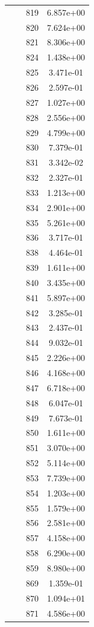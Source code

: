 \documentclass[12pt]{article}
\begin{document}
\begin{longtable}{@{}cccc@{}}
 &  & 819 & 6.857e+00 \\
 &  & 820 & 7.624e+00 \\
 &  & 821 & 8.306e+00 \\
 &  & 824 & 1.438e+00 \\
 &  & 825 & 3.471e-01 \\
 &  & 826 & 2.597e-01 \\
 &  & 827 & 1.027e+00 \\
 &  & 828 & 2.556e+00 \\
 &  & 829 & 4.799e+00 \\
 &  & 830 & 7.379e-01 \\
 &  & 831 & 3.342e-02 \\
 &  & 832 & 2.327e-01 \\
 &  & 833 & 1.213e+00 \\
 &  & 834 & 2.901e+00 \\
 &  & 835 & 5.261e+00 \\
 &  & 836 & 3.717e-01 \\
 &  & 838 & 4.464e-01 \\
 &  & 839 & 1.611e+00 \\
 &  & 840 & 3.435e+00 \\
 &  & 841 & 5.897e+00 \\
 &  & 842 & 3.285e-01 \\
 &  & 843 & 2.437e-01 \\
 &  & 844 & 9.032e-01 \\
 &  & 845 & 2.226e+00 \\
 &  & 846 & 4.168e+00 \\
 &  & 847 & 6.718e+00 \\
 &  & 848 & 6.047e-01 \\
 &  & 849 & 7.673e-01 \\
 &  & 850 & 1.611e+00 \\
 &  & 851 & 3.070e+00 \\
 &  & 852 & 5.114e+00 \\
 &  & 853 & 7.739e+00 \\
 &  & 854 & 1.203e+00 \\
 &  & 855 & 1.579e+00 \\
 &  & 856 & 2.581e+00 \\
 &  & 857 & 4.158e+00 \\
 &  & 858 & 6.290e+00 \\
 &  & 859 & 8.980e+00 \\
 &  & 869 & 1.359e-01 \\
 &  & 870 & 1.094e+01 \\
 &  & 871 & 4.586e+00 \\

\bottomrule
\end{longtable}
\end{document}
